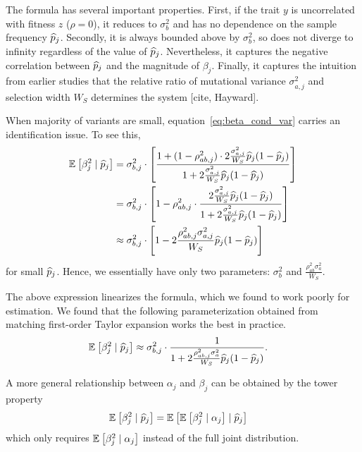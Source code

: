 \documentclass[10pt]{article}
\begin{document}
The formula has several important properties.
First, if the trait $y$ is uncorrelated with fitness $z$ ($\rho=0$), it reduces to $\sigma_b^2$ and has no dependence on the sample frequency $\widehat{p}_j$.
Secondly, it is always bounded above by $\sigma_b^2$, so does not diverge to infinity regardless of the value of $\widehat{p}_j$.
Nevertheless, it captures the negative correlation between $\widehat{p}_j$ and the magnitude of $\beta_j$.
Finally, it captures the intuition from earlier studies that the relative ratio of mutational variance $\sigma_{a,j}^2$ and selection width $W_S$ determines the system [cite, Hayward].

When majority of variants are small, equation~\ref{eq:beta_cond_var} carries an identification issue.
To see this,
\begin{align}
    \begin{aligned}
    \mathbb{E}_{}\left[\beta_j^2 \mid \widehat{p}_j\right] &= 
         \sigma_{b,j}^2 \cdot 
    \left[
        \frac{
            1 + (1-\rho_{ab,j}^2) \cdot 2\frac{\sigma_{a,j}^2}{W_S} \widehat{p}_j(1-\widehat{p}_j)}{
            1 + 2\frac{\sigma_{a,j}^2}{W_S} \widehat{p}_j(1-\widehat{p}_j) 
        }
    \right]  \\
    &= \sigma_{b,j}^2 \cdot 
    \left[
    1 - 
    \rho_{ab,j}^2 \cdot 
        \frac{
             2\frac{\sigma_{a,j}^2}{W_S} \widehat{p}_j(1-\widehat{p}_j)}{
            1 + 2\frac{\sigma_{a,j}^2}{W_S} \widehat{p}_j(1-\widehat{p}_j) 
        }
    \right] \\
    &\approx \sigma_{b,j}^2 \cdot 
    \left[
    1 - 
             2\frac{\rho_{ab,j}^2\sigma_{a,j}^2}{W_S} \widehat{p}_j(1-\widehat{p}_j)
    \right]
    \end{aligned}
\end{align}
for small $\widehat{p}_j$.
Hence, we essentially have only two parameters: $\sigma_{b}^2$ and $\frac{\rho^2_{ab}\sigma_a^2}{W_S}$.

The above expression linearizes the formula, which we found to work poorly for estimation.
We found that the following parameterization obtained from matching first-order Taylor expansion works the best in practice.
\begin{align}
    \begin{aligned}
     \mathbb{E}_{}\left[\beta_j^2 \mid \widehat{p}_j\right] &\approx
     \sigma_{b,j}^2 \cdot
     \frac{1}{1
     +2 \frac{\rho_{ab,j}^2\sigma_a^2}{W_S}\widehat{p}_j(1-\widehat{p}_j)}.
    \end{aligned} 
\end{align}

A more general relationship between $\alpha_j$ and $\beta_j$ can be obtained by the tower property
\begin{align}
    \begin{aligned}
        \mathbb{E}_{}\left[\beta_j^2 \mid \widehat{p}_j\right]
        &= \mathbb{E}_{}\left[\mathbb{E}_{}\left[\beta_j^2 \mid \alpha_j\right] \mid \widehat{p}_j\right]
    \end{aligned}
\end{align}
which only requires $\mathbb{E}_{}\left[\beta_j^2 \mid \alpha_j\right]$ instead of the full joint distribution.
\end{document}
